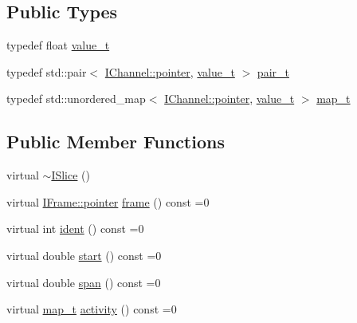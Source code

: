 \subsection*{Public Types}
\begin{DoxyCompactItemize}
\item 
typedef float \hyperlink{class_wire_cell_1_1_i_slice_a9d6f136d407740183a2c4d2078745a59}{value\+\_\+t}
\item 
typedef std\+::pair$<$ \hyperlink{class_wire_cell_1_1_i_data_aff870b3ae8333cf9265941eef62498bc}{I\+Channel\+::pointer}, \hyperlink{class_wire_cell_1_1_i_slice_a9d6f136d407740183a2c4d2078745a59}{value\+\_\+t} $>$ \hyperlink{class_wire_cell_1_1_i_slice_a24ec24749afee0e5a3c4fd8e3e878789}{pair\+\_\+t}
\item 
typedef std\+::unordered\+\_\+map$<$ \hyperlink{class_wire_cell_1_1_i_data_aff870b3ae8333cf9265941eef62498bc}{I\+Channel\+::pointer}, \hyperlink{class_wire_cell_1_1_i_slice_a9d6f136d407740183a2c4d2078745a59}{value\+\_\+t} $>$ \hyperlink{class_wire_cell_1_1_i_slice_ac953094751a404827468ca9887736415}{map\+\_\+t}
\end{DoxyCompactItemize}
\subsection*{Public Member Functions}
\begin{DoxyCompactItemize}
\item 
virtual \hyperlink{class_wire_cell_1_1_i_slice_a404b8cc429d0527953db8a5697e22673}{$\sim$\+I\+Slice} ()
\item 
virtual \hyperlink{class_wire_cell_1_1_i_data_aff870b3ae8333cf9265941eef62498bc}{I\+Frame\+::pointer} \hyperlink{class_wire_cell_1_1_i_slice_abc8484df4c8c4624b4a6e0819e5916e1}{frame} () const =0
\item 
virtual int \hyperlink{class_wire_cell_1_1_i_slice_ab5c8c4d99b373a92cdd54ef5dafde4ec}{ident} () const =0
\item 
virtual double \hyperlink{class_wire_cell_1_1_i_slice_a46a59a60460e2915f80b9647b3b3a82d}{start} () const =0
\item 
virtual double \hyperlink{class_wire_cell_1_1_i_slice_a9c461c84b7b71199ea521bd274df42c6}{span} () const =0
\item 
virtual \hyperlink{class_wire_cell_1_1_i_slice_ac953094751a404827468ca9887736415}{map\+\_\+t} \hyperlink{class_wire_cell_1_1_i_slice_ab1bf2647aa2a184fc851d765612bd0a6}{activity} () const =0
\end{DoxyCompactItemize}


